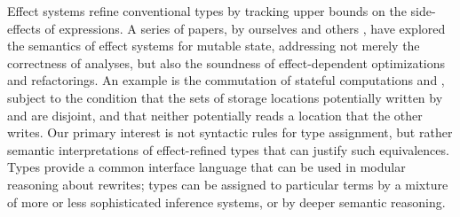 \documentclass[orivec]{llncs}
\newcommand{\keywd}[1]{\mathtt{#1}}
\newcommand{\squelch}[1]{}
\newcommand{\letin}[2]{\keywd{let}\:{#1}\!\Leftarrow\!{#2}\:\keywd{in}\:}
\newcommand{\rdsin}[1]{\mathrm{rds}({#1})}
\newcommand{\wrsin}[1]{\mathrm{wrs}({#1})}
\newcommand{\eff}{\varepsilon}
\begin{document}
Effect systems \cite{DBLP:conf/lfp/GiffordL86} refine conventional
types by tracking upper bounds on the side-effects of expressions.  A
series of papers, by ourselves and others
\cite{DBLP:conf/popl/KammarP12,DBLP:conf/ppdp/BentonKBH09,DBLP:conf/ppdp/BentonKBH07,DBLP:conf/aplas/BentonKHB06,DBLP:conf/icfp/ThamsborgB11},
have explored the semantics of effect systems for mutable state,
addressing not merely the correctness of analyses, but also the
soundness of effect-dependent optimizations and refactorings. An
example is the commutation of stateful computations  and ,
subject to the condition that the sets of storage locations
potentially written by  and  are disjoint, and that neither
potentially reads a location that the other writes.  \squelch{If one
  gives expressions refined monadic types of the form ,
  meaning `computations returning results of type  with
  side-effects bounded by ', for a suitable choice of effect
  annotations , then effect-dependent equivalences can be
  formalized in terms of conditions on annotations. For example
  \infrule {\Gamma\vdash M:T_\eff\tau \andalso \Gamma\vdash
    N:T_{\eff'}\tau' \andalso \Gamma,x:\tau,y:\tau' \vdash
    P:T_{\eff''}\tau''\\ \wrsin{\eff}\cap
    \wrsin{\eff'}=\rdsin{\eff}\cap \wrsin{\eff'} = \rdsin{\eff'}\cap
    \wrsin{\eff}=\emptyset} {\Gamma
    \vdash \begin{array}{l}\letin{x}{M}{\letin{y}{N}{P}}\\ =
      \letin{y}{N}{\letin{x}{M}{P}}\end{array} :
    T_{\eff\cup\eff'\cup\eff''}\tau''}

\noindent
where  and  are the sets of possibly-read
and possibly-written variables (or regions) in .} Our primary
interest is not syntactic rules for type assignment, but rather
semantic interpretations of effect-refined types that can justify such
equivalences.  Types provide a common interface language that can be
used in modular reasoning about rewrites; types can be assigned to
particular terms by a mixture of more or less sophisticated inference
systems, or by deeper semantic reasoning. \squelch{Clearly, such a
  separation of concerns requires that the interpretation of types be
  independent of any inference system.}
\end{document}
